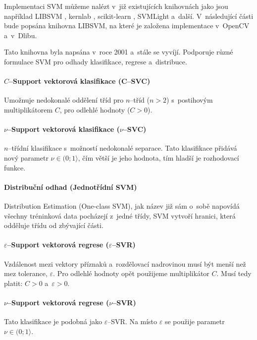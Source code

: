 Implementaci SVM můžeme nalézt v~již existujících knihovnách jako jsou například LIBSVM \cite{libsvm}, kernlab \cite{kernlab}, scikit-learn \cite{scikit-learn}, SVMLight \cite{svmlight} a~další. V~následující části bude popsána knihovna LIBSVM, na které je založena implementace v~OpenCV a~v~Dlibu.  

Tato knihovna byla napsána v~roce 2001 \cite{libsvm} a~stále se vyvíjí. Podporuje různé formulace SVM pro odhady klasifikace, regrese a~distribuce.

\paragraph*{$C$--Support vektorová klasifikace (C--SVC)} 
Umožnuje nedokonalé oddělení tříd pro $n$--tříd ($n > 2$) s~postihovým multiplikátorem $C$, pro odlehlé hodnoty ($C > 0$). \cite{csvmclass}

\paragraph*{$\nu$--Support vektorová klasifikace ($\nu$--SVC)} 
$n$--třídní klasifikace s~možností nedokonalé separace. Tato klasifikace přidává nový parametr $\nu \in (0;1\rangle$, čím větší je jeho hodnota, tím hladší je rozhodovací funkce. \cite{nusvmsvrclass}

\paragraph*{Distribuční odhad (Jednotřídní SVM)} 
Distribution Estimation (One-class SVM), jak název již sám o~sobě napovídá všechny tréninková data pocházejí z~jedné třídy, SVM vytvoří hranici, která odděluje třídu od zbývající části. \cite{oneclasssvm}

\paragraph*{$\varepsilon$--Support vektorová regrese ($\varepsilon$--SVR)} 
Vzdálenost mezi vektory příznaků a~rozdělovací nadrovinou musí být menší než mez tolerance, $\varepsilon$. Pro odlehlé hodnoty opět použijeme multiplikátor $C$. Musí tedy platit: $C > 0$ a~$\varepsilon > 0$. \cite{svrsvm}

\paragraph*{$\nu$--Support vektorová regrese ($\nu$--SVR)} 
Tato klasifikace je podobná jako $\varepsilon$--SVR. Na místo $\varepsilon$ se použije parametr $\nu \in (0;1\rangle$. \cite{nusvmsvrclass}

